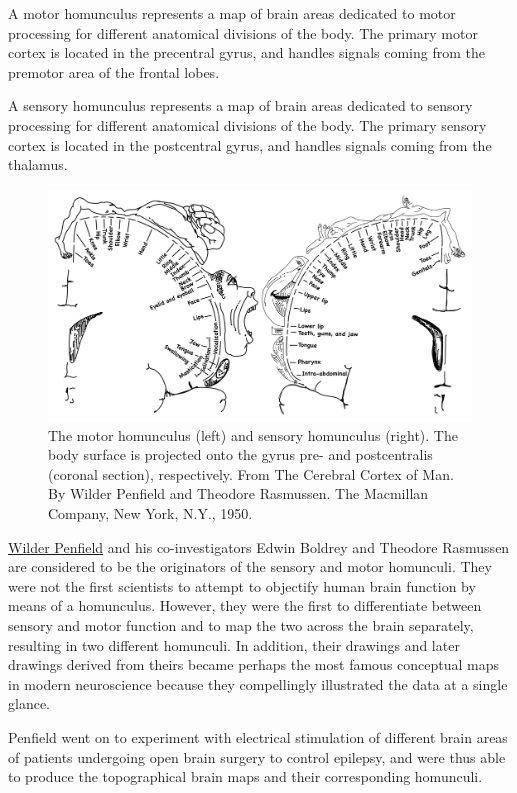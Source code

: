 A motor homunculus represents a map of brain areas dedicated to motor processing for different anatomical divisions of the body. The primary motor cortex is located in the precentral gyrus, and handles signals coming from the premotor area of the frontal lobes.

A sensory homunculus represents a map of brain areas dedicated to sensory processing for different anatomical divisions of the body. The primary sensory cortex is located in the postcentral gyrus, and handles signals coming from the thalamus.



\begin{figure}

{\centering \includegraphics[width=0.7\linewidth]{./figures/cns/motor_and_sensory_homunculus} 

}

\caption{The motor homunculus (left) and sensory homunculus (right). The body surface is projected onto the gyrus pre- and postcentralis (coronal section), respectively. From The Cerebral Cortex of Man. By Wilder Penfield and Theodore Rasmussen. The Macmillan Company, New York, N.Y., 1950.}\label{fig:homunculus}
\end{figure}

\href{https://en.wikipedia.org/wiki/Wilder_Penfield}{Wilder Penfield} and his co-investigators Edwin Boldrey and Theodore Rasmussen are considered to be the originators of the sensory and motor homunculi. They were not the first scientists to attempt to objectify human brain function by means of a homunculus. However, they were the first to differentiate between sensory and motor function and to map the two across the brain separately, resulting in two different homunculi. In addition, their drawings and later drawings derived from theirs became perhaps the most famous conceptual maps in modern neuroscience because they compellingly illustrated the data at a single glance.

Penfield went on to experiment with electrical stimulation of different brain areas of patients undergoing open brain surgery to control epilepsy, and were thus able to produce the topographical brain maps and their corresponding homunculi.

